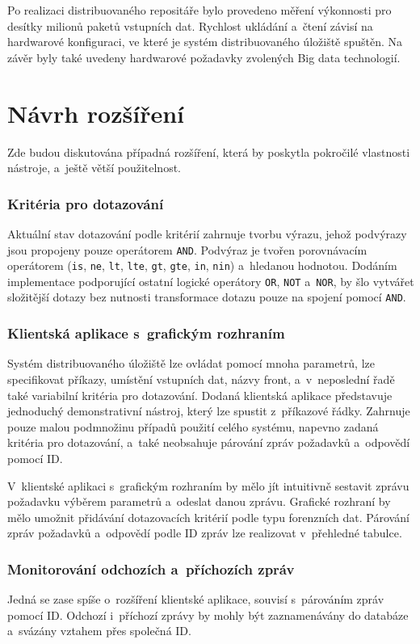 Po realizaci distribuovaného repositáře bylo provedeno měření výkonnosti pro desítky milionů paketů vstupních dat. Rychlost ukládání a~čtení závisí na hardwarové konfiguraci, ve které je systém distribuovaného úložiště spuštěn. Na závěr byly také uvedeny hardwarové požadavky zvolených Big data technologií.

\section{Návrh rozšíření}
Zde budou diskutována případná rozšíření, která by poskytla pokročilé vlastnosti nástroje, a~ještě větší použitelnost.

\subsubsection{Kritéria pro dotazování}
Aktuální stav dotazování podle kritérií zahrnuje tvorbu výrazu, jehož podvýrazy jsou propojeny pouze operátorem \texttt{AND}. Podvýraz je tvořen porovnávacím operátorem (\texttt{is}, \texttt{ne}, \texttt{lt}, \texttt{lte}, \texttt{gt}, \texttt{gte}, \texttt{in}, \texttt{nin}) a~hledanou hodnotou. Dodáním implementace podporující ostatní logické operátory \texttt{OR}, \texttt{NOT} a~\texttt{NOR}, by šlo vytvářet složitější dotazy bez nutnosti transformace dotazu pouze na spojení pomocí \texttt{AND}.

\subsubsection{Klientská aplikace s~grafickým rozhraním}
Systém distribuovaného úložiště lze ovládat pomocí mnoha parametrů, lze specifikovat příkazy, umístění vstupních dat, názvy front, a~v~neposlední řadě také variabilní kritéria pro dotazování. Dodaná klientská aplikace představuje jednoduchý demonstrativní nástroj, který lze spustit z~příkazové řádky. Zahrnuje pouze malou podmnožinu případů použití celého systému, napevno zadaná kritéria pro dotazování, a~také neobsahuje párování zpráv požadavků a~odpovědí pomocí ID.

V~klientské aplikaci s~grafickým rozhraním by mělo jít intuitivně sestavit zprávu požadavku výběrem parametrů a~odeslat danou zprávu. Grafické rozhraní by mělo umožnit přidávání dotazovacích kritérií podle typu forenzních dat. Párování zpráv požadavků a~odpovědí podle ID zpráv lze realizovat v~přehledné tabulce.

\subsubsection{Monitorování odchozích a~příchozích zpráv}
Jedná se zase spíše o~rozšíření klientské aplikace, souvisí s~párováním zpráv pomocí ID. Odchozí i~příchozí zprávy by mohly být zaznamenávány do databáze a~svázány vztahem přes společná ID.

